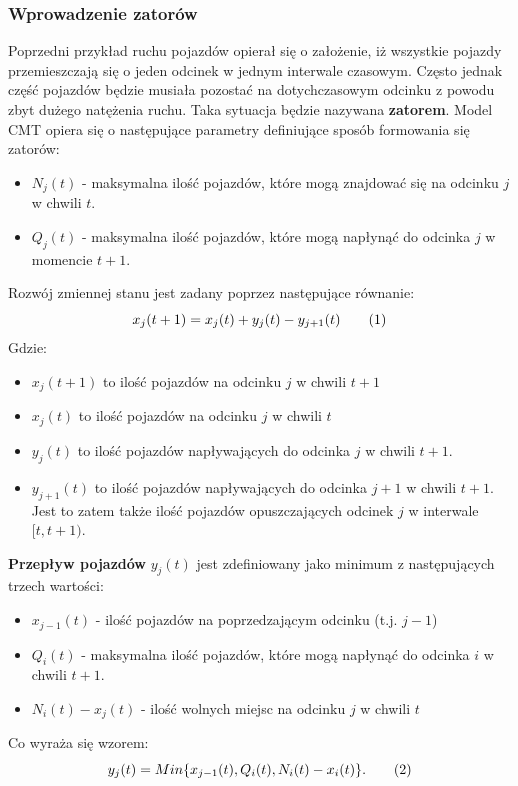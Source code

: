 \documentclass[12pt]{book}
\theoremstyle{plain}
\newcommand\addtag{\refstepcounter{equation}
\renewcommand{\labelenumii}{\theenumii}
\renewcommand{\theenumii}{\theenumi.\arabic{enumii}.}
\tag{\theequation}}
\begin{document}
\subsubsection*{Wprowadzenie zatorów}
Poprzedni przykład ruchu pojazdów opierał się o założenie, iż wszystkie pojazdy przemieszczają się o jeden odcinek w jednym interwale czasowym. Często jednak część pojazdów będzie musiała pozostać na dotychczasowym odcinku z powodu zbyt dużego natężenia ruchu. Taka sytuacja będzie nazywana \textbf{zatorem}. Model CMT opiera się o następujące parametry definiujące sposób formowania się zatorów:
\begin{itemize}
	\item $N_j(t)$ - maksymalna ilość pojazdów, które mogą znajdować się na odcinku $j$ w chwili $t$.
	\item $Q_j(t)$ - maksymalna ilość pojazdów, które mogą napłynąć do odcinka $j$ w momencie $t+1$.
\end{itemize}
Rozwój zmiennej stanu jest zadany poprzez następujące równanie:
\[x_j(t+1)=x_j(t)+y_j(t)-y_{j+1}(t) \addtag \]
Gdzie:
\begin{itemize}
	\item $x_j(t+1)$ to ilość pojazdów na odcinku $j$ w chwili $t+1$
	\item $x_j(t)$ to ilość pojazdów na odcinku $j$ w chwili $t$
	\item $y_j(t)$ to ilość pojazdów napływających do odcinka $j$ w chwili $t+1$.
	\item $y_{j+1}(t)$ to ilość pojazdów napływających do odcinka $j+1$ w chwili $t+1$. Jest to zatem także ilość pojazdów opuszczających odcinek $j$ w interwale $[t,t+1)$.
\end{itemize}
\textbf{Przepływ pojazdów} $y_j(t)$ jest zdefiniowany jako minimum z następujących trzech wartości:
\begin{itemize}
	\item $ x_{j-1}(t) $ - ilość pojazdów na poprzedzającym odcinku (t.j. $j-1$)
	\item $ Q_i(t) $ - maksymalna ilość pojazdów, które mogą napłynąć do odcinka $i$ w chwili $t+1$.
	\item $ N_i(t)-x_j(t) $ - ilość wolnych miejsc na odcinku $j$ w chwili $t$
\end{itemize}
Co wyraża się wzorem:
\[
y_j(t)=Min\{x_{j-1}(t),Q_i(t),N_i(t)-x_i(t)\}. \addtag \label{eq_y_CTM}
\]
\end{document}
